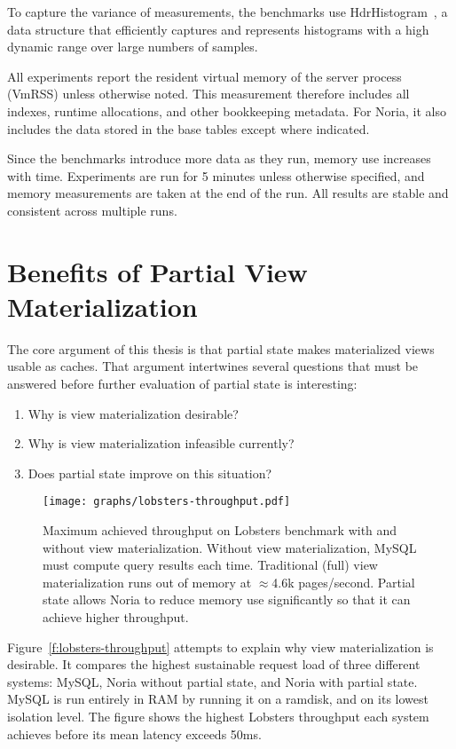 To capture the variance of measurements, the benchmarks use
HdrHistogram~\cite{hdrhistogram}, a data structure that efficiently captures and
represents histograms with a high dynamic range over large numbers of samples.

All experiments report the resident virtual memory of the server process (VmRSS)
unless otherwise noted. This measurement therefore includes all indexes, runtime
allocations, and other bookkeeping metadata. For Noria, it also includes the
data stored in the base tables except where indicated.

Since the benchmarks introduce more data as they run, memory use increases with
time. Experiments are run for 5 minutes unless otherwise specified, and memory
measurements are taken at the end of the run. All results are stable and
consistent across multiple runs.

\section{Benefits of Partial View Materialization}
\label{s:eval:why}

The core argument of this thesis is that partial state makes materialized views
usable as caches. That argument intertwines several questions that must be
answered before further evaluation of partial state is interesting:

\begin{enumerate}
    \item Why is view materialization desirable?
    \item Why is view materialization infeasible currently?
    \item Does partial state improve on this situation?
\end{enumerate}

\begin{figure}[h]
  \centering
  \texttt{[image: graphs/lobsters-throughput.pdf]}
  \caption{Maximum achieved throughput on Lobsters benchmark with and without
  view materialization. Without view materialization, MySQL must compute query
  results each time. Traditional (full) view materialization runs out of memory
  at $\approx$4.6k pages/second. Partial state allows Noria to reduce memory use
  significantly so that it can achieve higher throughput.}
  \label{f:lobsters-throughput}
\end{figure}

Figure~\vref{f:lobsters-throughput} attempts to explain why view materialization
is desirable. It compares the highest sustainable request load of three
different systems: MySQL, Noria without partial state, and Noria with partial
state. MySQL is run entirely in RAM by running it on a ramdisk, and on its
lowest isolation level. The figure shows the highest Lobsters throughput each
system achieves before its mean latency exceeds 50ms.

